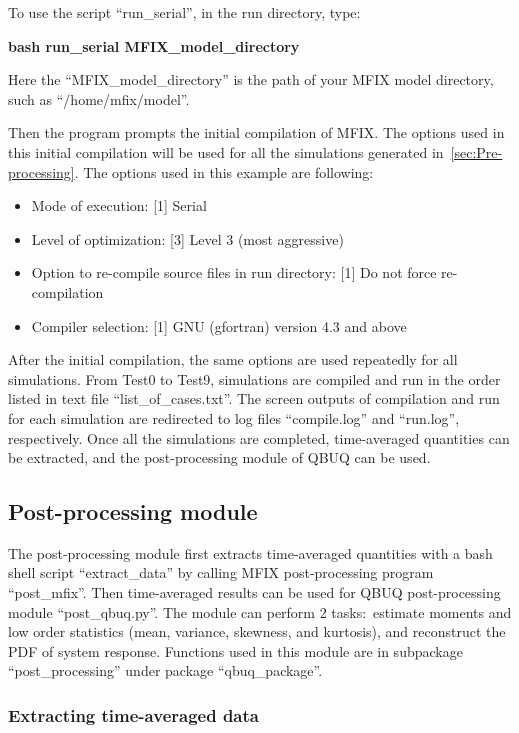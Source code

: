 \documentclass[a4paper,12pt,titlepage]{article}
\begin{document}
To use the script ``run\_serial'', in the run directory, type:

\textbf{bash run\_serial MFIX\_model\_directory}

Here the ``MFIX\_model\_directory'' is the path of your MFIX model directory, 
such as ``/home/mfix/model''.

Then the program prompts the initial compilation of MFIX. The options used in 
this initial compilation will be used for all the simulations generated 
in~\ref{sec:Pre-processing}. The options used in this example are following:

\begin{itemize}
 \item Mode of execution: [1] Serial
 \item Level of optimization: [3] Level 3 (most aggressive)
 \item Option to re-compile source files in run directory: [1] Do not force 
 re-compilation
 \item Compiler selection: [1] GNU (gfortran) version 4.3 and above
\end{itemize}

After the initial compilation, the same options are used repeatedly for all 
simulations. From Test0 to Test9, simulations are compiled and run in the order
listed in text file ``list\_of\_cases.txt''. The screen outputs of compilation 
and run for each simulation are redirected to log files ``compile.log'' and
``run.log'', respectively. Once all the simulations are completed, time-averaged 
quantities can be extracted, and the post-processing module of QBUQ can be used.

\subsection{Post-processing module}
\label{sec:Post-processing}

The post-processing module first extracts time-averaged quantities with a bash
shell script ``extract\_data'' by calling MFIX post-processing program 
``post\_mfix''. Then time-averaged results can be used for QBUQ post-processing 
module ``post\_qbuq.py''. The module can perform 2 tasks:\ estimate moments and 
low order statistics (mean, variance, skewness, and kurtosis), and reconstruct 
the PDF of system response. Functions used in this module are in subpackage 
``post\_processing'' under package ``qbuq\_package''.

\subsubsection{Extracting time-averaged data}
\label{sec:ExtractData}
\end{document}
